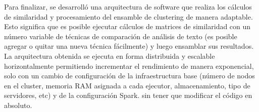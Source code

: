 \bigskip Para finalizar, se desarrolló una arquitectura de software que realiza los cálculos de similaridad y procesamiento del ensamble de clustering de manera adaptable. Esto significa que es posible ejecutar cálculos de matrices de similaridad con un número variable de técnicas de comparación de análisis de texto (es posible agregar o quitar una nueva técnica fácilmente) y luego ensamblar sus resultados. La arquitectura obtenida se ejecuta en forma distribuida y escalable horizontalmente permitiendo incrementar el rendimiento de manera exponencial, solo con un cambio de configuración de la infraestructura base (número de nodos en el cluster, memoria RAM asignada a cada ejecutor, almacenamiento, tipo de servidores, etc) y de la configuración Spark. sin tener que modificar el código en absoluto.